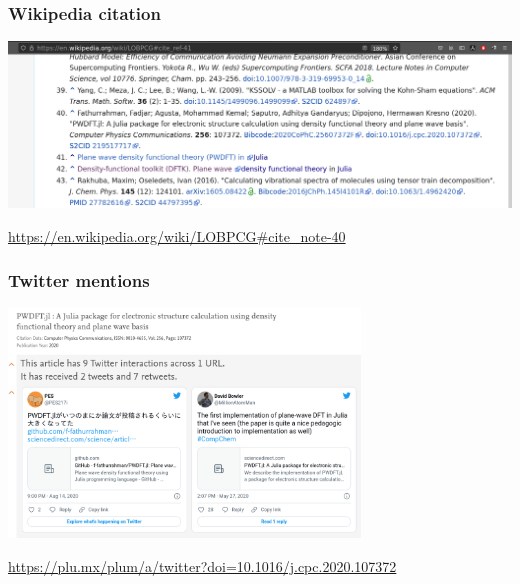 \begin{frame}
\frametitle{Wikipedia citation}

{\centering
\includegraphics[width=\textwidth]{images/LOBPCG_wikipedia.png}
\par}

{\footnotesize
\url{https://en.wikipedia.org/wiki/LOBPCG\#cite_note-40}
}

\end{frame}


\begin{frame}
\frametitle{Twitter mentions}

{\centering
\includegraphics[width=0.7\textwidth]{images/Plumx_Tweet.png}
\par}

{\footnotesize
\url{https://plu.mx/plum/a/twitter?doi=10.1016/j.cpc.2020.107372}
}

\end{frame}


